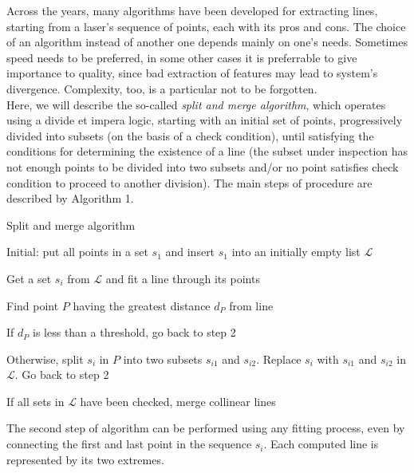 \documentclass[a4paper, onecolumn]{report}
\begin{document}
Across the years, many algorithms have been developed for extracting lines, starting from a laser's sequence of points, each with its pros and cons. The choice of an algorithm instead of another one depends mainly on one's needs. Sometimes speed needs to be preferred, in some other cases it is preferrable to give importance to quality, since bad extraction of features may lead to system's divergence. Complexity, too, is a particular not to be forgotten. \\ 
Here, we will describe the so-called \emph{split and merge algorithm}, which operates using a divide et impera logic, starting with an initial set of points, progressively divided into subsets (on the basis of a check condition), until satisfying the conditions for determining the existence of a line (the subset under inspection has not enough points to be divided into two subsets and/or no point satisfies check condition to proceed to another division).
The main steps of procedure are described by Algorithm 1.
\begin{algorithm}
\caption{Split and merge algorithm}\label{euclid}
\begin{algorithmic}[1]
\item{Initial: put all points in a set $s_1$ and insert $s_1$ into an initially empty list $\mathcal{L}$}
\item{Get a set $s_i$ from $\mathcal{L}$ and fit a line through its points}
\item{Find point $P$ having the greatest distance $d_P$ from line}
\item{If $d_P$ is less than a threshold, go back to step 2}
\item{Otherwise, split $s_i$ in $P$ into two subsets $s_{i1}$ and $s_{i2}$. Replace $s_i$ with $s_{i1}$ and $s_{i2}$ in $\mathcal{L}$. Go back to step 2}
\item{If all sets in $\mathcal{L}$ have been checked, merge collinear lines}
\end{algorithmic}
\end{algorithm}
The second step of algorithm can be performed using any fitting process, even by connecting the first and last point in the sequence $s_i$. Each computed line is represented by its two extremes.
\end{document}
